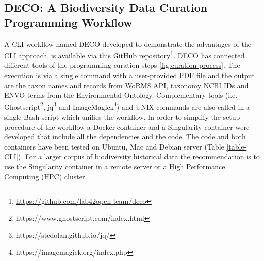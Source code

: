 \begin{table}[ht]
\large
{}
\caption{The platforms where the CLI workflow was tested.Please note that running time can be affected by internet speed and stability due to API calls. The workflow uses open source tools and software libraries that are distributed across the major platforms; Linux, Mac and Windows.}
\label{table-CLI}
\end{table}

   \subsection{DECO: A Biodiversity Data Curation Programming Workflow}
A CLI workflow named DECO developed to demonstrate the advantages of the CLI
approach, is available via this GitHub repository\footnote{\url{https://github.com/lab42open-team/deco}}.
DECO has connected different tools of the programming curation steps
\ref{fig:curation-process}. The execution is via a single command with a
user-provided PDF file and the output are the taxon names and records from
WoRMS API, taxonomy NCBI IDs and ENVO terms from the Environmental Ontology.
Complementary tools (i.e. Ghostscript\footnote{https://www.ghostscript.com/index.html},
jq\footnote{https://stedolan.github.io/jq/} and ImageMagick\footnote{https://imagemagick.org/index.php})
and UNIX commands are also called in a single Bash script which unifies
the workflow. In order to simplify the setup procedure of the workflow a Docker
container and a Singularity container were developed that include all the
dependencies and the code. The code and both containers have been tested on
Ubuntu, Mac and Debian server (Table \ref{table-CLI}). For a larger corpus of biodiversity
historical data the recommendation is to use the Singularity container in a
remote server or a High Performance Computing (HPC) cluster.

